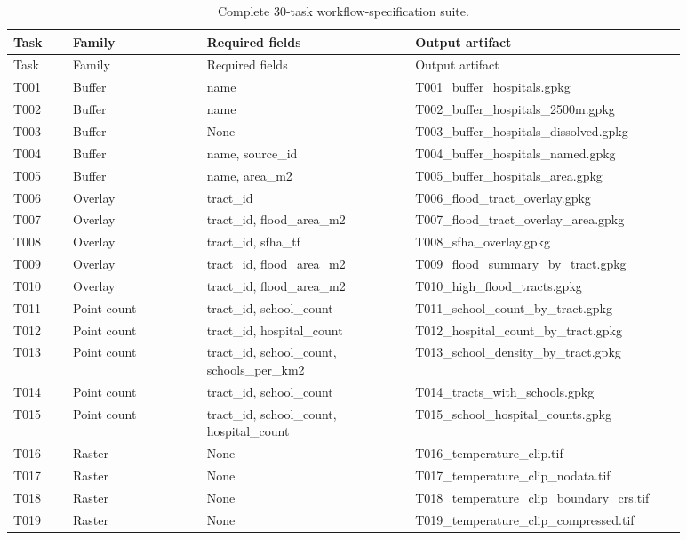 \begin{longtable}{p{0.08\linewidth}p{0.18\linewidth}p{0.28\linewidth}p{0.34\linewidth}}
\caption{Complete 30-task workflow-specification suite.}\label{tab:task-suite-long}\\
\toprule
Task & Family & Required fields & Output artifact \\
\midrule
\endfirsthead
\toprule
Task & Family & Required fields & Output artifact \\
\midrule
\endhead
T001 & Buffer & name & T001\_buffer\_hospitals.gpkg \\
T002 & Buffer & name & T002\_buffer\_hospitals\_2500m.gpkg \\
T003 & Buffer & None & T003\_buffer\_hospitals\_dissolved.gpkg \\
T004 & Buffer & name, source\_id & T004\_buffer\_hospitals\_named.gpkg \\
T005 & Buffer & name, area\_m2 & T005\_buffer\_hospitals\_area.gpkg \\
T006 & Overlay & tract\_id & T006\_flood\_tract\_overlay.gpkg \\
T007 & Overlay & tract\_id, flood\_area\_m2 & T007\_flood\_tract\_overlay\_area.gpkg \\
T008 & Overlay & tract\_id, sfha\_tf & T008\_sfha\_overlay.gpkg \\
T009 & Overlay & tract\_id, flood\_area\_m2 & T009\_flood\_summary\_by\_tract.gpkg \\
T010 & Overlay & tract\_id, flood\_area\_m2 & T010\_high\_flood\_tracts.gpkg \\
T011 & Point count & tract\_id, school\_count & T011\_school\_count\_by\_tract.gpkg \\
T012 & Point count & tract\_id, hospital\_count & T012\_hospital\_count\_by\_tract.gpkg \\
T013 & Point count & tract\_id, school\_count, schools\_per\_km2 & T013\_school\_density\_by\_tract.gpkg \\
T014 & Point count & tract\_id, school\_count & T014\_tracts\_with\_schools.gpkg \\
T015 & Point count & tract\_id, school\_count, hospital\_count & T015\_school\_hospital\_counts.gpkg \\
T016 & Raster & None & T016\_temperature\_clip.tif \\
T017 & Raster & None & T017\_temperature\_clip\_nodata.tif \\
T018 & Raster & None & T018\_temperature\_clip\_boundary\_crs.tif \\
T019 & Raster & None & T019\_temperature\_clip\_compressed.tif \\

\end{longtable}
